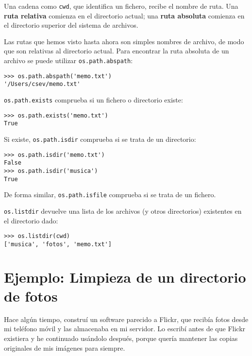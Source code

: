
Una cadena como {\tt cwd}, que identifica un fichero, recibe el nombre de ruta.
Una {\bf ruta relativa} comienza en el directorio actual;
una {\bf ruta absoluta} comienza en el directorio superior del
sistema de archivos.


Las rutas que hemos visto hasta ahora son simples nombres de archivo, de modo que
son relativas al directorio actual. Para encontrar la ruta absoluta de
un archivo se puede utilizar {\tt os.path.abspath}:

\beforeverb
\begin{verbatim}
>>> os.path.abspath('memo.txt')
'/Users/csev/memo.txt'
\end{verbatim}
\afterverb
%
{\tt os.path.exists} comprueba
si un fichero o directorio existe:


\beforeverb
\begin{verbatim}
>>> os.path.exists('memo.txt')
True
\end{verbatim}
\afterverb
%
Si existe, {\tt os.path.isdir} comprueba si se trata de un directorio:

\beforeverb
\begin{verbatim}
>>> os.path.isdir('memo.txt')
False
>>> os.path.isdir('musica')
True
\end{verbatim}
\afterverb
%
De forma similar, {\tt os.path.isfile} comprueba si se trata de un fichero.

{\tt os.listdir} devuelve una lista de los archivos (y otros directorios)
existentes en el directorio dado:

\beforeverb
\begin{verbatim}
>>> os.listdir(cwd)
['musica', 'fotos', 'memo.txt']
\end{verbatim}
\afterverb
%


\section{Ejemplo: Limpieza de un directorio de fotos}

Hace algún tiempo, construí un software parecido a Flickr, que
recibía fotos desde mi teléfono móvil y las almacenaba
en mi servidor. Lo escribí antes de que Flickr existiera y he continuado
usándolo después, porque quería mantener las copias originales
de mis imágenes para siempre.

